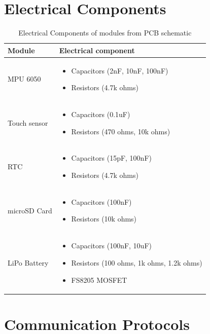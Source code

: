 \documentclass[12pt, titlepage]{article}
\begin{document}
\section{Electrical Components}
\begin{table}[H]
	\begin{tabular}{| p{4cm} | p{12cm} |}
		 \hline
		 \textbf{Module} & \textbf{Electrical component}\\
		\hline
		 MPU 6050  & \begin{itemize}
						\item{Capacitors (2nF, 10nF, 100nF)}
						\item{Resistors (4.7k ohms)}
					\end{itemize}\\
		\hline
		 Touch sensor  & \begin{itemize}
						\item{Capacitors (0.1uF)}
						\item{Resistors (470 ohms, 10k ohms)}
					\end{itemize}\\
		 \hline
		 RTC  & \begin{itemize}
						\item{Capacitors (15pF, 100nF)}
						\item{Resistors (4.7k ohms)}
					\end{itemize}\\
		 \hline
		 microSD Card & \begin{itemize}
						\item{Capacitors (100nF)}
						\item{Resistors (10k ohms)}
					\end{itemize}\\
		 \hline
		 LiPo Battery & \begin{itemize}
						\item{Capacitors (100nF, 10uF)}
						\item{Resistors (100 ohms, 1k ohms, 1.2k ohms)}
						\item{FS8205 MOSFET}
					\end{itemize}\\
		 \hline
	\end{tabular}
\caption{\label{DesignElectrical}Electrical Components of modules from PCB schematic}  
\end{table}

\section{Communication Protocols}
\end{document}
